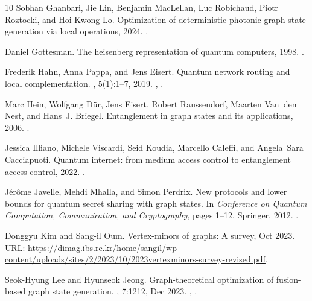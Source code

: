 \documentclass[10pt,a4paper]{article}
\begin{document}
\begin{thebibliography}{10}
Sobhan Ghanbari, Jie Lin, Benjamin MacLellan, Luc Robichaud, Piotr Roztocki,
  and Hoi-Kwong Lo.
\newblock Optimization of deterministic photonic graph state generation via
  local operations, 2024.
\newblock \href {https://arxiv.org/abs/2401.00635} {}.

Daniel Gottesman.
\newblock The heisenberg representation of quantum computers, 1998.
\newblock \href {https://arxiv.org/abs/quant-ph/9807006}
  {}.

Frederik Hahn, Anna Pappa, and Jens Eisert.
\newblock Quantum network routing and local complementation.
, 5(1):1--7, 2019.
\newblock \href {https://arxiv.org/abs/1805.04559} {},
  \href {https://doi.org/10.1038/s41534-019-0191-6}
  {}.

Marc Hein, Wolfgang D{\"u}r, Jens Eisert, Robert Raussendorf, Maarten Van~den
  Nest, and Hans~J. Briegel.
\newblock Entanglement in graph states and its applications, 2006.
\newblock \href {https://arxiv.org/abs/quant-ph/0602096}
  {}.

Jessica Illiano, Michele Viscardi, Seid Koudia, Marcello Caleffi, and
  Angela~Sara Cacciapuoti.
\newblock Quantum internet: from medium access control to entanglement access
  control, 2022.
\newblock \href {https://arxiv.org/abs/2205.11923} {}.

J{\'e}r{\^o}me Javelle, Mehdi Mhalla, and Simon Perdrix.
\newblock New protocols and lower bounds for quantum secret sharing with graph
  states.
\newblock In {\em Conference on Quantum Computation, Communication, and
  Cryptography}, pages 1--12. Springer, 2012.
\newblock \href {https://arxiv.org/abs/1109.1487} {}.

Donggyu Kim and Sang-il Oum.
\newblock Vertex-minors of graphs: A survey, Oct 2023.
\newblock URL:
  \url{https://dimag.ibs.re.kr/home/sangil/wp-content/uploads/sites/2/2023/10/2023vertexminors-survey-revised.pdf}.

Seok-Hyung Lee and Hyunseok Jeong.
\newblock Graph-theoretical optimization of fusion-based graph state
  generation.
, 7:1212, Dec 2023.
\newblock \href {https://arxiv.org/abs/2304.11988} {},
  \href {https://doi.org/10.22331/q-2023-12-20-1212}
  {}.


\end{thebibliography}
\end{document}
